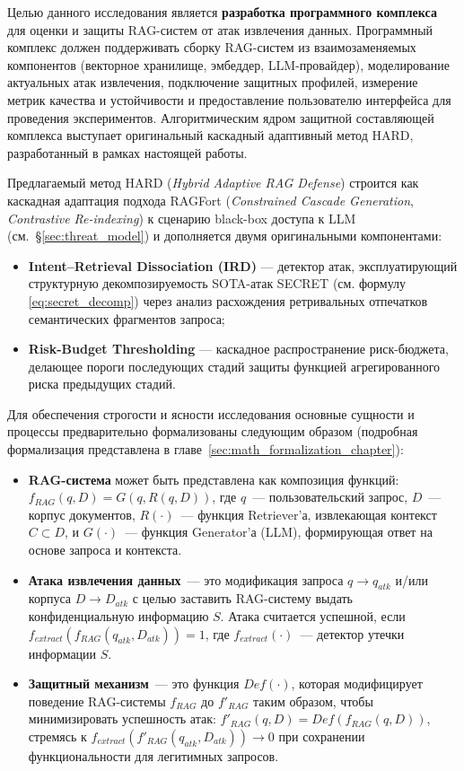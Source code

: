 \documentclass[12pt, a4paper]{article}
\theoremstyle{definition}
\theoremstyle{remark}
\begin{document}
Целью данного исследования является \textbf{разработка программного комплекса} для оценки и защиты RAG-систем от атак извлечения данных. Программный комплекс должен поддерживать сборку RAG-систем из взаимозаменяемых компонентов (векторное хранилище, эмбеддер, LLM-провайдер), моделирование актуальных атак извлечения, подключение защитных профилей, измерение метрик качества и устойчивости и предоставление пользователю интерфейса для проведения экспериментов. Алгоритмическим ядром защитной составляющей комплекса выступает оригинальный каскадный адаптивный метод HARD, разработанный в рамках настоящей работы.

Предлагаемый метод HARD (\textit{Hybrid Adaptive RAG Defense}) строится как каскадная адаптация подхода RAGFort (\textit{Constrained Cascade Generation}, \textit{Contrastive Re-indexing}) к сценарию black-box доступа к LLM (см.~\S\ref{sec:threat_model}) и дополняется двумя оригинальными компонентами:
\begin{itemize}[label=$\bullet$]
    \item \textbf{Intent--Retrieval Dissociation (IRD)} — детектор атак, эксплуатирующий структурную декомпозируемость SOTA-атак SECRET (см. формулу \eqref{eq:secret_decomp}) через анализ расхождения ретривальных отпечатков семантических фрагментов запроса;
    \item \textbf{Risk-Budget Thresholding} — каскадное распространение риск-бюджета, делающее пороги последующих стадий защиты функцией агрегированного риска предыдущих стадий.
\end{itemize}

Для обеспечения строгости и ясности исследования основные сущности и процессы предварительно формализованы следующим образом (подробная формализация представлена в главе~\ref{sec:math_formalization_chapter}):
\begin{itemize}[label=$\square$]
    \item \textbf{RAG-система} может быть представлена как композиция функций: $f_{RAG}(q, D) = G(q, R(q, D))$, где $q$~--- пользовательский запрос, $D$~--- корпус документов, $R(\cdot)$~--- функция Retriever'а, извлекающая контекст $C \subset D$, и $G(\cdot)$~--- функция Generator'а (LLM), формирующая ответ на основе запроса и контекста.
    \item \textbf{Атака извлечения данных}~--- это модификация запроса $q \to q_{atk}$ и/или корпуса $D \to D_{atk}$ с целью заставить RAG-систему выдать конфиденциальную информацию $S$. Атака считается успешной, если $f_{extract}(f_{RAG}(q_{atk}, D_{atk})) = 1$, где $f_{extract}(\cdot)$~--- детектор утечки информации $S$.
    \item \textbf{Защитный механизм}~--- это функция $Def(\cdot)$, которая модифицирует поведение RAG-системы $f_{RAG}$ до $f'_{RAG}$ таким образом, чтобы минимизировать успешность атак: $f'_{RAG}(q, D) = Def(f_{RAG}(q, D))$, стремясь к $f_{extract}(f'_{RAG}(q_{atk}, D_{atk})) \to 0$ при сохранении функциональности для легитимных запросов.
\end{itemize}
\end{document}
